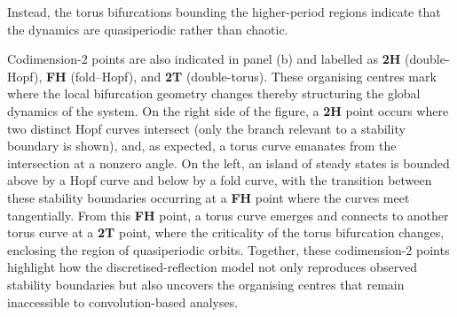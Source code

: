 Instead, the torus bifurcations bounding the higher-period regions indicate that the dynamics are quasiperiodic rather than chaotic.
%
\par
%
Codimension-2 points are also indicated in panel (b) and labelled as \textbf{2H} (double-Hopf), \textbf{FH} (fold–Hopf), and \textbf{2T} (double-torus). 
These organising centres mark where the local bifurcation geometry changes thereby structuring the global dynamics of the system. 
On the right side of the figure, a \textbf{2H} point occurs where two distinct Hopf curves intersect (only the branch relevant to a stability boundary is shown), and, as expected, a torus curve emanates from the intersection at a nonzero angle. 
On the left, an island of steady states is bounded above by a Hopf curve and below by a fold curve, with the transition between these stability boundaries occurring at a \textbf{FH} point where the curves meet tangentially. 
From this \textbf{FH} point, a torus curve emerges and connects to another torus curve at a \textbf{2T} point, where the criticality of the torus bifurcation changes, enclosing the region of quasiperiodic orbits.
Together, these codimension-2 points highlight how the discretised-reflection model not only reproduces observed stability boundaries but also uncovers the organising centres that remain inaccessible to convolution-based analyses. 

